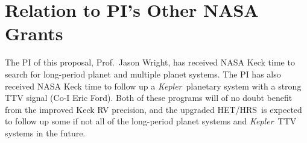 \documentclass[12pt]{article}
\def\kepler{{\it Kepler}}
\def\hrs{HET/HRS}
\begin{document}
\vspace{-3pt}
\section{Relation to PI's Other NASA Grants}

The PI of this proposal, Prof.~Jason Wright, has received NASA Keck
time to search for long-period planet and multiple planet systems.
The PI has also received NASA Keck time to follow up a
\kepler\ planetary system with a strong TTV signal (Co-I Eric
Ford). Both of these programs will of no doubt benefit from the
improved Keck RV precision, and the upgraded \hrs\ is expected to
follow up some if not all of the long-period planet systems and
\kepler\ TTV systems in the future.


\vspace{-3pt}
{\small %
 }
\end{document}
